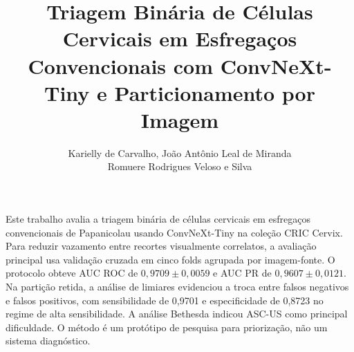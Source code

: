 \documentclass[12pt]{article}
\title{Triagem Binária de Células Cervicais em Esfregaços Convencionais
com ConvNeXt-Tiny e Particionamento por Imagem}
\author{Karielly de Carvalho\inst{1}, João Antônio Leal de Miranda\inst{1}\\
Romuere Rodrigues Veloso e Silva\inst{1}}
\begin{document}
\maketitle


\begin{resumo}
Este trabalho avalia a triagem binária de células cervicais em esfregaços
convencionais de Papanicolau usando ConvNeXt-Tiny na coleção CRIC Cervix. Para
reduzir vazamento entre recortes visualmente correlatos, a avaliação principal
usa validação cruzada em cinco folds agrupada por imagem-fonte. O protocolo
obteve AUC ROC de $0{,}9709\pm0{,}0059$ e AUC PR de $0{,}9607\pm0{,}0121$. Na
partição retida, a análise de limiares evidenciou a troca entre falsos
negativos e falsos positivos, com sensibilidade de 0,9701 e especificidade de
0,8723 no regime de alta sensibilidade. A análise Bethesda indicou ASC-US como
principal dificuldade. O método é um protótipo de pesquisa para priorização,
não um sistema diagnóstico.
\end{resumo}





% 




\end{document}
